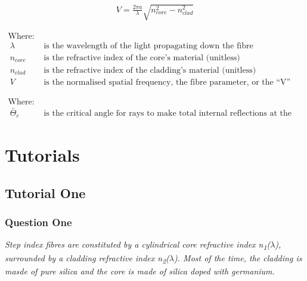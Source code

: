 \documentclass[colorlinks,11pt,a4paper,normalphoto,withhyper,ragged2e]{altareport}
\begin{document}
\begin{paracol}{2}

\medskip

\setlength{\jot}{2ex}
\begin{align}
	V = \frac{2 \pi a}{\lambda}\sqrt{n_{core}^2 - n_{clad}^2} \nonumber
\end{align}

\switchcolumn

\setlength{\jot}{1ex}
\begin{align}
	\text{Where:}& \nonumber\\\
	\lambda & \text{ is the wavelength of the light propagating down the fibre} \nonumber\\\
	n_{core} & \text{ is the refractive index of the core's material (unitless)} \nonumber\\\
	n_{clad} & \text{ is the refractive index of the cladding's material (unitless)} \nonumber\\\
	V & \text{ is the normalised spatial frequency, the fibre parameter, or the ``V'' parameter} \nonumber\
\end{align}

\end{paracol}



\begin{align}
	\text{Where:}& \nonumber\\\
	\bar{\Theta}_c & \text{ is the critical angle for rays to make total internal reflections at the core-cladding boundary (Radians)} \nonumber\
\end{align}




\newpage




\section{Tutorials}
\subsection{Tutorial One}
\subsubsection{Question One}
\textit{Step index fibres are constituted by a cylindrical core refractive index n\textsubscript{1}($\lambda$), surrounded by a cladding refractive index n\textsubscript{2}($\lambda$). Most of the time, the cladding is masde of pure silica and the core is made of silica doped with germanium.} \\
\end{document}
